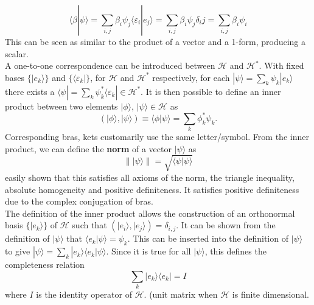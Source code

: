 \documentclass{article}
\begin{document}
\begin{equation}
\langle \beta|\psi\rangle = \sum_{i,j} \beta_i\psi_j\langle\varepsilon_i|e_j\rangle= \sum_{i,j}\beta_i\psi_j\delta_ij=\sum_{i,j}\beta_i\psi_i
\label{eq: bra-ket action}
\end{equation}
This can be seen as similar to the product of a vector and a 1-form, producing a scalar.\\
\indent A one-to-one correspondence can be introduced between $\mathcal{H}$ and $\mathcal{H}^*$. With fixed bases $\lbrace |e_k\rangle\rbrace$ and $\lbrace\langle\varepsilon_k|\rbrace$, for $\mathcal{H}$ and $\mathcal{H}^*$ respectively, for each $|\psi\rangle=\sum_k\psi_k|e_k\rangle$ there exists a $\langle\psi| = \sum_k\psi^*_k\langle\varepsilon_k| \in \mathcal{H}^*$. It is then possible to define an inner product between two elements $|\phi\rangle$, $|\psi\rangle\in \mathcal{H}$ as
\begin{equation}
(|\phi\rangle, |\psi\rangle) \equiv \langle \phi | \psi \rangle = \sum_k \phi^*_k\psi_k.
\label{eq: innerproduct}
\end{equation}
Corresponding bras, kets customarily use the same letter/symbol. From the inner product, we can define the \textbf{norm} of a vector $|\psi\rangle$ as 
\begin{equation}
\||\psi\rangle\|=\sqrt{\langle\psi|\psi\rangle}
\label{eq: norm}
\end{equation}
easily shown that this satisfies all axioms of the norm, the triangle inequality, absolute homogeneity and positive definiteness. It satisfies positive definiteness due to the complex conjugation of bras.\\
\indent The definition of the inner product allows the construction of an orthonormal basis $\lbrace|e_k\rangle\rbrace$ of $\mathcal{H}$ such that $(|e_i\rangle,|e_j\rangle)=\delta_{i,j}$. It can be shown from the definition of $|\psi\rangle$ that $\langle e_k|\psi\rangle=\psi_k$. This can be inserted into the definition of $|\psi\rangle$ to give $|\psi\rangle=\sum_k|e_k\rangle\langle e_k|\psi\rangle$. Since it is true for all $|\psi\rangle$, this defines the completeness relation
\begin{equation}
\sum_k|e_k\rangle\langle e_k| = I
\label{eq: completeness}
\end{equation}
where $I$ is the identity operator of $\mathcal{H}$. (unit matrix when $\mathcal{H}$ is finite dimensional.\\
\end{document}
